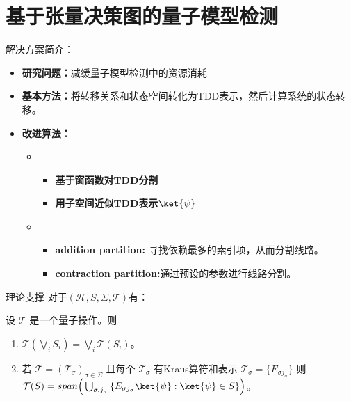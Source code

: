 \documentclass[aspectratio=1610]{ctexbeamer}
\begin{document}
\section{基于张量决策图的量子模型检测}
\begin{frame}{解决方案简介：}
    \begin{itemize}
        \item \textbf{研究问题：}减缓量子模型检测中的资源消耗
        \item \textbf{基本方法：}将转移关系和状态空间转化为TDD表示，然后计算系统的状态转移。
        \item \textbf{改进算法：}
        \begin{itemize}
            \item \begin{itemize}
                \item \textbf{基于窗函数对TDD分割}
                \item \textbf{用子空间近似TDD表示$\ket{\psi}$}
            \end{itemize}
            \item
            \begin{itemize}
                \item \textbf{addition partition:} 寻找依赖最多的索引项，从而分割线路。
                \item \textbf{contraction partition:}通过预设的参数进行线路分割。
            \end{itemize}
        \end{itemize}
    \end{itemize}
\end{frame}
\begin{frame}{理论支撑}
    对于$(\mathcal{H},S,\Sigma,\mathcal{T})$有：
    \begin{theorem}
        \label{theorem-model}
        设 $\mathcal{T}$ 是一个量子操作。则
    \begin{enumerate}
        \item $\mathcal{T}(\bigvee_{i}{S_i})=\bigvee_{i}{\mathcal{T}(S_i)}$。
        \item 若 $\mathcal{T}=(\mathcal{T}_\sigma)_{\sigma \in \Sigma}$ 且每个 $\mathcal{T}_{\sigma}$ 有Kraus算符和表示 $\mathcal{T}_{\sigma}= \{ E_{\sigma j_\sigma} \}$
    则
    $\mathcal{T}(S)=span\Big(\bigcup_{\sigma,j_\sigma}{\{E_{\sigma j_\sigma}\ket{\psi}:\ket{\psi}\in S\}}\Big)$。
    \end{enumerate}
    \end{theorem}
\end{frame}
\end{document}
